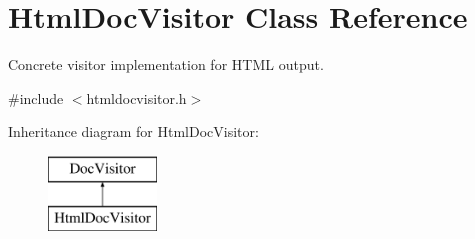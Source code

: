 \hypertarget{class_html_doc_visitor}{}\section{Html\+Doc\+Visitor Class Reference}
\label{class_html_doc_visitor}


Concrete visitor implementation for H\+T\+ML output.  




{\ttfamily \#include $<$htmldocvisitor.\+h$>$}

Inheritance diagram for Html\+Doc\+Visitor\+:\begin{figure}[H]
\begin{center}
\leavevmode
\includegraphics[height=2.000000cm]{class_html_doc_visitor}
\end{center}
\end{figure}
